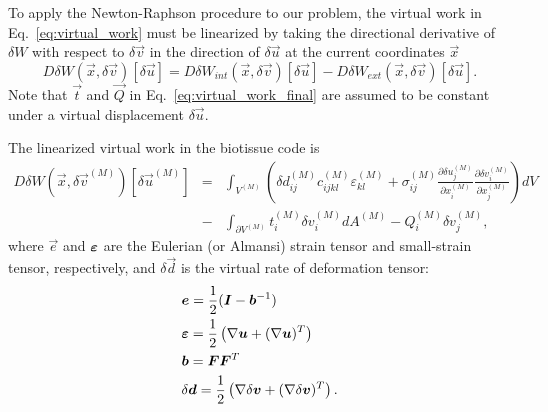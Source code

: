 To apply the Newton-Raphson procedure to our problem, the virtual work in Eq.\ \eqref{eq:virtual_work} must be linearized by taking the directional derivative of $\delta W$ with respect to $\delta \vec{v}$ in the direction of $\delta \vec{u}$ at the current coordinates $\vec{x}$
%
\begin{equation}
D\delta W (\vec{x},\delta \vec{v}) [\delta \vec{u}] = D\delta W_{int} (\vec{x},\delta \vec{v}) [\delta \vec{u}] - D\delta W_{ext} (\vec{x},\delta \vec{v}) [\delta \vec{u}].
\end{equation}
%
%
Note that $\vec{t}$ and $\vec{Q}$ in Eq.\ \eqref{eq:virtual_work_final} are assumed to be constant under a virtual displacement \(\delta \vec{u}\).

The linearized virtual work in the biotissue code is 
%
\begin{eqnarray}
D\delta W(\vec{x},\delta \vec{v}^{(M)})[\delta \vec{u}^{(M)}]  
%
&=& \int_{V^{(M)}} \left(\delta d_{ij}^{(M)} c_{ijkl}^{(M)} \varepsilon_{kl}^{(M)} +  \sigma_{ij}^{(M)} \frac{\partial \delta u_j^{(M)}}{\partial x_i^{(M)}}\frac{\partial \delta v_i^{(M)}}{\partial x_j^{(M)}}\right) d V \nonumber \\
&-& \int_{\partial V^{(M)}} t_i^{(M)} \delta v_i^{(M)} dA^{(M)} - Q_i^{(M)} \delta v_j^{(M)},
\label{eq:virtual_work_linearized}
\end{eqnarray}
%
where $\vec{e}$ and $\bm{\varepsilon}$ are the Eulerian (or Almansi) strain tensor and small-strain tensor, respectively, and $\delta \vec{d}$ is the virtual rate of deformation tensor: 
%
\begin{align}
&\mat{e} = \frac{1}{2}(\mat{I} - \mat{b}^{-1}) \nonumber\\
%
&\mat{\varepsilon} = \frac{1}{2}\left(\nabla \vec{u} + (\nabla \vec{u})^T\right) \nonumber\\
%
&\mat{b} = \mat{F}\mat{F}^T \\
%
&\delta \vec{d} = \frac{1}{2}\left(\nabla \delta \vec{v}  + (\nabla \delta \vec{v})^T\right).
\end{align}
%

